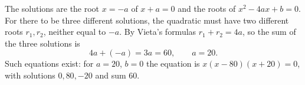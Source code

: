 The solutions are the root $x=-a$ of $x+a=0$ and the roots of $x^2-4ax+b=0$. For there to be three different solutions, the quadratic must have two different roots $r_1,r_2$, neither equal to $-a$. By Vieta's formulas $r_1+r_2=4a$, so the sum of the three solutions is
\[4a+(-a)=3a=60,\qquad a=\boxed{20}.\]
Such equations exist: for $a=20$, $b=0$ the equation is $x(x-80)(x+20)=0$, with solutions $0,80,-20$ and sum $60$.
